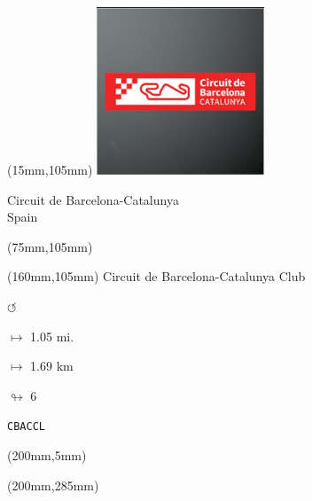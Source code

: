 \begin{textblock*}{50mm}(15mm,105mm)%
\includegraphics[width=50mm]{LG/2015-05-20_00078.png}
\par Circuit de Barcelona-Catalunya\\ Spain
\end{textblock*}
\begin{textblock*}{80mm}(75mm,105mm)%
\end{textblock*}
\begin{textblock*}{40mm}(160mm,105mm)%
Circuit de Barcelona-Catalunya Club
\par \Huge$\circlearrowleft$
\Large
\par$\mapsto$ 1.05 mi.
\par$\mapsto$ 1.69 km
\par$\looparrowright$ 6
\par\hfill\tiny\tt CBACCL\\
\end{textblock*}
\begin{textblock*}{20mm}(200mm,5mm)%
\fbox{\thepage}
\end{textblock*}
\begin{textblock*}{20mm}(200mm,285mm)%
\fbox{\thepage}
\end{textblock*}
\null\newpage

